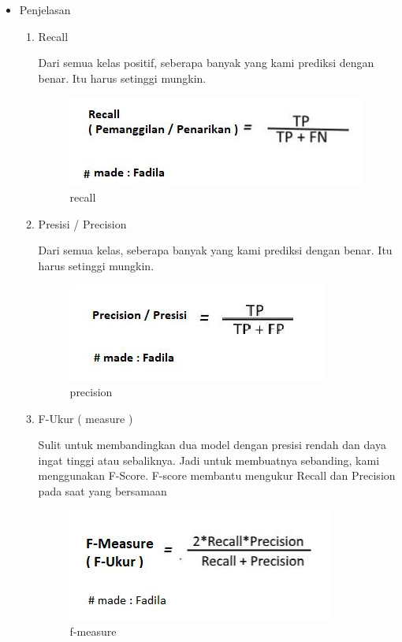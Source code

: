 \begin{enumerate}
\begin{itemize}
\par
\begin{itemize}
\item Penjelasan
\begin{enumerate}
\item Recall
\par Dari semua kelas positif, seberapa banyak yang kami prediksi dengan benar. Itu harus setinggi mungkin.
\par

\begin{figure}[ht]
\centering
\includegraphics[scale=0.6]{figures/recall.jpg}
\caption{recall}
\label{contoh}
\end{figure}

\par
\item Presisi / Precision
\par Dari semua kelas, seberapa banyak yang kami prediksi dengan benar. Itu harus setinggi mungkin.
\par

\begin{figure}[ht]
\centering
\includegraphics[scale=0.6]{figures/precision.jpg}
\caption{precision}
\label{contoh}
\end{figure}

\par
\item F-Ukur ( measure )
\par Sulit untuk membandingkan dua model dengan presisi rendah dan daya ingat tinggi atau sebaliknya. Jadi untuk membuatnya sebanding, kami menggunakan F-Score. F-score membantu mengukur Recall dan Precision pada saat yang bersamaan
\par

\begin{figure}[ht]
\centering
\includegraphics[scale=0.6]{figures/f.jpg}
\caption{f-measure}
\label{contoh}
\end{figure}


\end{enumerate}
\end{itemize}
\end{itemize}
\end{enumerate}
